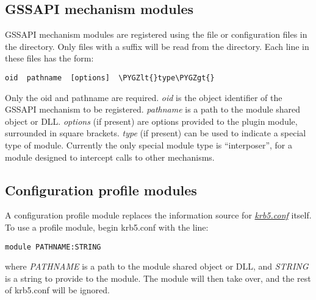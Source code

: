 \documentclass[letterpaper,10pt,english]{sphinxmanual}
\def\PYGZlt{\char`\<}
\def\PYGZgt{\char`\>}
\begin{document}
\subsection{GSSAPI mechanism modules}
\label{admin/host_config:gssapi-plugin-config}\label{admin/host_config:gssapi-mechanism-modules}
GSSAPI mechanism modules are registered using the file
 or configuration files in the 
directory.  Only files with a  suffix will be read from the
 directory.  Each line in these files has the
form:

\begin{Verbatim}[commandchars=\\\{\}]
oid  pathname  [options]  \PYGZlt{}type\PYGZgt{}
\end{Verbatim}

Only the oid and pathname are required.  \emph{oid} is the object
identifier of the GSSAPI mechanism to be registered.  \emph{pathname} is a
path to the module shared object or DLL.  \emph{options} (if present) are
options provided to the plugin module, surrounded in square brackets.
\emph{type} (if present) can be used to indicate a special type of module.
Currently the only special module type is ``interposer'', for a module
designed to intercept calls to other mechanisms.


\subsection{Configuration profile modules}
\label{admin/host_config:profile-plugin-config}\label{admin/host_config:configuration-profile-modules}
A configuration profile module replaces the information source for
{\hyperref[admin/conf_files/krb5_conf:krb5-conf-5]{\emph{krb5.conf}}} itself.  To use a profile module, begin krb5.conf
with the line:

\begin{Verbatim}[commandchars=\\\{\}]
module PATHNAME:STRING
\end{Verbatim}

where \emph{PATHNAME} is a path to the module shared object or DLL, and
\emph{STRING} is a string to provide to the module.  The module will then
take over, and the rest of krb5.conf will be ignored.
\end{document}
